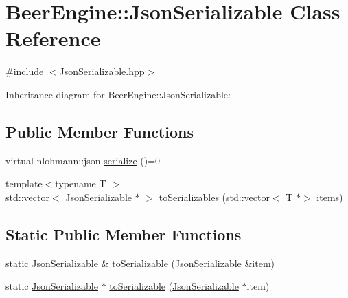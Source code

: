 \hypertarget{class_beer_engine_1_1_json_serializable}{}\section{Beer\+Engine\+:\+:Json\+Serializable Class Reference}
\label{class_beer_engine_1_1_json_serializable}


{\ttfamily \#include $<$Json\+Serializable.\+hpp$>$}



Inheritance diagram for Beer\+Engine\+:\+:Json\+Serializable\+:
\subsection*{Public Member Functions}
\begin{DoxyCompactItemize}
\item 
virtual nlohmann\+::json \mbox{\hyperlink{class_beer_engine_1_1_json_serializable_a17689cbd8fe282c570bd026cc1be5b3b}{serialize}} ()=0
\item 
{\footnotesize template$<$typename T $>$ }\\std\+::vector$<$ \mbox{\hyperlink{class_beer_engine_1_1_json_serializable}{Json\+Serializable}} $\ast$ $>$ \mbox{\hyperlink{class_beer_engine_1_1_json_serializable_a80649111ff7da289151d17201f9e1d19}{to\+Serializables}} (std\+::vector$<$ \mbox{\hyperlink{namespace_beer_engine_a94f0b552f6dc910de8cdb44207981f53a8de48e594408f9fc561b2f68ce05f664}{T}} $\ast$$>$ items)
\end{DoxyCompactItemize}
\subsection*{Static Public Member Functions}
\begin{DoxyCompactItemize}
\item 
static \mbox{\hyperlink{class_beer_engine_1_1_json_serializable}{Json\+Serializable}} \& \mbox{\hyperlink{class_beer_engine_1_1_json_serializable_a48f83f0e913d9a7f4962f30ac8ff450b}{to\+Serializable}} (\mbox{\hyperlink{class_beer_engine_1_1_json_serializable}{Json\+Serializable}} \&item)
\item 
static \mbox{\hyperlink{class_beer_engine_1_1_json_serializable}{Json\+Serializable}} $\ast$ \mbox{\hyperlink{class_beer_engine_1_1_json_serializable_ae56f6be872da47edbb9a1f25a2eccc0e}{to\+Serializable}} (\mbox{\hyperlink{class_beer_engine_1_1_json_serializable}{Json\+Serializable}} $\ast$item)
\end{DoxyCompactItemize}


